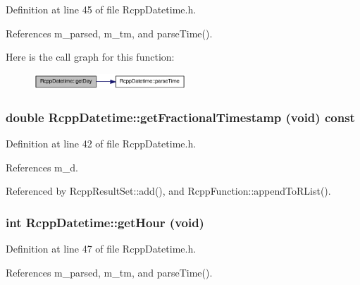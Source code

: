 Definition at line 45 of file RcppDatetime.h.

References m\_\-parsed, m\_\-tm, and parseTime().

Here is the call graph for this function:\nopagebreak
\begin{figure}[H]
\begin{center}
\leavevmode
\includegraphics[width=162pt]{classRcppDatetime_a23e9f09bef162e1ffef0e43f8a446b77_cgraph}
\end{center}
\end{figure}
\hypertarget{classRcppDatetime_acb74d27387c0d851414e20d30354ac62}{
\subsubsection[{getFractionalTimestamp}]{\setlength{\rightskip}{0pt plus 5cm}double RcppDatetime::getFractionalTimestamp (void) const}}
\label{classRcppDatetime_acb74d27387c0d851414e20d30354ac62}


Definition at line 42 of file RcppDatetime.h.

References m\_\-d.

Referenced by RcppResultSet::add(), and RcppFunction::appendToRList().\hypertarget{classRcppDatetime_a0da8db1ecd235a6e7ab309e70e4e93b0}{
\subsubsection[{getHour}]{\setlength{\rightskip}{0pt plus 5cm}int RcppDatetime::getHour (void)}}
\label{classRcppDatetime_a0da8db1ecd235a6e7ab309e70e4e93b0}


Definition at line 47 of file RcppDatetime.h.

References m\_\-parsed, m\_\-tm, and parseTime().

